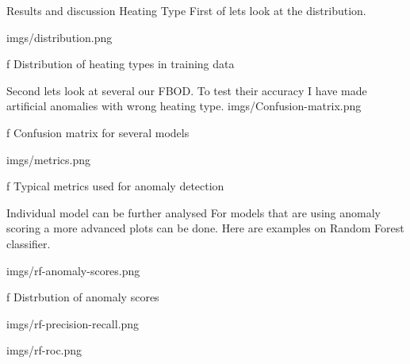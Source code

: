 
\chap Results and discussion
\sec Heating Type
First of lets look at the distribution.

\medskip
{}
\picw=15cm \cinspic imgs/distribution.png
\caption/f Distribution of heating types in training data
\medskip


Second lets look at several our FBOD. To test their accuracy I have made artificial anomalies with wrong heating type.
\medskip
{}
\picw=15cm \cinspic imgs/Confusion-matrix.png
\caption/f Confusion matrix for several models
\medskip

\medskip
{}
\picw=15cm \cinspic imgs/metrics.png
\caption/f Typical metrics used for anomaly detection
\medskip

\secc Individual model can be further analysed
For models that are using anomaly scoring a more advanced plots can be done. Here are examples on Random Forest classifier.

\medskip
\picw=15cm \cinspic imgs/rf-anomaly-scores.png
\caption/f Distrbution of anomaly scores
\medskip


\medskip
\picw=10cm \cinspic imgs/rf-precision-recall.png
\medskip

\medskip
\picw=10cm \cinspic imgs/rf-roc.png
\medskip